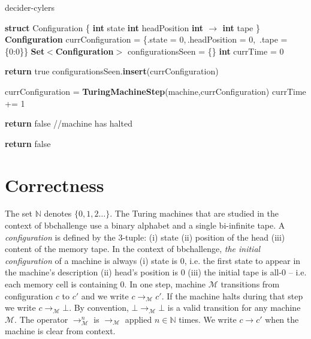 \documentclass[a4paper,british]{article}
\newcommand{\tabi}{\hspace{\algorithmicindent}}
\begin{document}
\begin{algorithm}
        \caption{{\sc decider-cylers}}

        \begin{algorithmic}[1]

                \State \textbf{struct} Configuration \{
                \State \tabi\textbf{int} state
                \State \tabi\textbf{int} headPosition
                \State \tabi\textbf{int $\boldsymbol{\to}$ int} tape
                \State \}
                \State \textbf{Configuration} currConfiguration = \{.state = 0,$\,$.headPosition = 0,$\,$ .tape = \{0:0\}\}
                \State \textbf{Set$\boldsymbol{<}$Configuration$\boldsymbol{>}$} configurationsSeen = \{\}
                \State \textbf{int} currTime = 0

                \State \textbf{return} true
                \EndIf
                \State configurationsSeen.\textbf{insert}(currConfiguration)

                \State currConfiguration = \textbf{TuringMachineStep}(machine,currConfiguration)
                \State currTime += 1


                \State \textbf{return} false //machine has halted
                \EndIf
                \EndWhile

                \State \textbf{return} false
                \EndProcedure

        \end{algorithmic}
\end{algorithm}

\section{Correctness}

The set $\mathbb{N}$ denotes $\{0,1,2\dots\}$. The Turing machines that are studied in the context of bbchallenge use a binary alphabet and a single bi-infinite tape. A \textit{configuration} is defined by the 3-tuple: (i) state (ii) position of the head (iii) content of the memory tape. In the context of bbchallenge, \textit{the initial configuration} of a machine is always (i) state is 0, i.e. the first state to appear in the machine's description (ii) head's position is 0 (iii) the initial tape is all-0 -- i.e. each memory cell is containing 0. In one step, machine $\mathcal{M}$ transitions from configuration $c$ to $c'$ and we write $c \to_\mathcal{M} c'$. If the machine halts during that step we write $c \to_\mathcal{M} \bot$. By convention, $\bot \to_\mathcal{M} \bot$ is a valid transition for any machine $\mathcal{M}$.  The operator $\to_\mathcal{M}^n$ is $\to_\mathcal{M}$ applied $n\in\mathbb{N}$ times. We write $c \to c'$ when the machine is clear from context.
\end{document}
